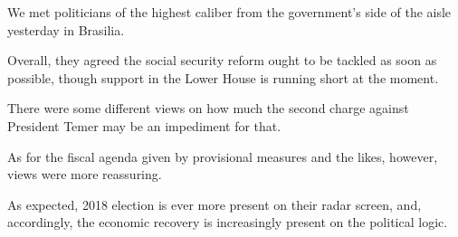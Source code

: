\documentclass[11pt]{article}
\date{}
\title{}
\begin{document}
\begin{compactitem}
\item We met politicians of the highest caliber from
the government's side of the aisle yesterday in Brasilia.
\item Overall, they agreed the social security reform ought to
be tackled as soon as possible, though support in the Lower House is
running short at the moment.
\item There were some different views on how much the second charge
against President Temer may be an impediment for that.
\item As for the fiscal agenda given by provisional measures and the
likes, however, views were more reassuring.
\item As expected, 2018 election is ever more present on their radar
screen, and, accordingly, the economic recovery is increasingly
present on the political logic.
\end{compactitem}
\end{document}
